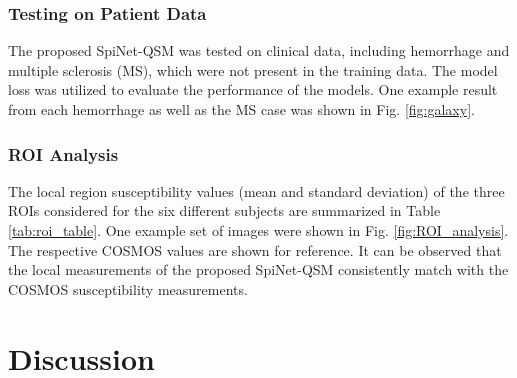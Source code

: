 \documentclass[sn-vancouver,Numbered]{sn-jnl}%
\begin{document}
\subsubsection{Testing on Patient Data}
The proposed SpiNet-QSM was tested on clinical data, including hemorrhage and multiple sclerosis (MS), which were not present in the training data. The model loss was utilized to evaluate the performance of the models. One example result from each hemorrhage as well as the MS case was shown in Fig. \ref{fig:galaxy}. 




\subsubsection{ROI Analysis}

The local region susceptibility values (mean and standard deviation) of the three ROIs considered for the six different subjects are summarized in Table \ref{tab:roi_table}. One example set of images were shown in Fig. \ref{fig:ROI_analysis}. The respective COSMOS values are shown for reference. It can be observed that the local measurements of the proposed SpiNet-QSM consistently match with the COSMOS susceptibility measurements.



\section{Discussion }
\end{document}
